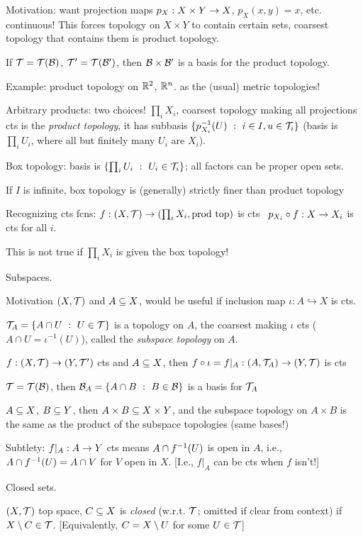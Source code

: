 \documentclass[12pt]{article}
\begin{document}
Motivation: want projection maps $p_X:X\times Y\rightarrow X$, $p_X(x,y)=x$, etc. continuous! This
forces topology on $X\times Y$ to contain certain sets, coarsest topology that contains them 
is product topology.

If ${\mathcal T}={\mathcal T}({\mathcal B})$, ${\mathcal T}^\prime={\mathcal T}({\mathcal B}^\prime)$, then ${\mathcal B}\times{\mathcal B}^\prime$ is a basis for the product topology.

Example: product topology on ${\mathbb R}^2$, ${\mathbb R}^n$.  as the (usual) metric topologies!

Arbitrary products: two choices! $\prod_i X_i$, coarsest topology making all projections cts
is the {\it product topology}, it has subbasis $\{p_{X_i}^{-1}(U)\ :\ i\in I, u\in {\mathcal T}_i\}$
(basis is $\prod_i U_i$, where all but finitely many $U_i$ are $X_i$).

Box topology: basis is $\{\prod_i U_i\ :\ U_i\in\mt_i\}$; all factors can be proper open sets.

If $I$ is infinite, box topology is (generally) strictly finer than product topology

Recognizing cts fcns: $f:(X,{\mathcal T})\rightarrow (\prod_i X_i,\textrm{prod top})$ is cts \lra\ 
$p_{X_i}\circ f: X\rightarrow X_i$ is cts for all $i$.

This is not true if $\prod_i X_i$ is given the box topology!

\msk

Subspaces.

Motivation $(X,{\mathcal T})$ and $A\subseteq X$, would be useful if inclusion map $\iota:A\hookrightarrow X$
is cts.

${\mathcal T}_A = \{A\cap U\ :\ U\in{\mathcal T}\}$ is a topology on $A$, the coarsest making $\iota$ cts
($A\cap U = \iota^{-1}(U)$), called the {\it subspace topology} on $A$.

$f:(X,{\mathcal T})\rightarrow (Y,{\mathcal T}^\prime)$ cts and $A\subseteq X$, then $f\circ\iota=f|_A:(A,{\mathcal T}_A)\rightarrow (Y,{\mathcal T})$ is cts

${\mathcal T}={\mathcal T}({\mathcal B})$, then ${\mathcal B}_A = \{A\cap B\ :\ B\in{\mathcal B}\}$ is a basis for ${\mathcal T}_A$
 
$A\subseteq X$, $B\subseteq Y$, then $A\times B\subseteq X\times Y$, and the subspace topology on 
$A\times B$ is the same as the product of the subspace topologies (same bases!)

Subtlety: $f|_A:A\rightarrow Y$ cts means $A\cap f^{-1}(U)$ is open in $A$, i.e.,
$A\cap f^{-1}(U)=A\cap V$ for \ubr{some} $V$ open in $X$. [I.e., $f|_A$ can be cts when $f$ isn't!]

\msk

Closed sets.

$(X,{\mathcal T})$ top space, $C\subseteq X$ is {\it closed} (w.r.t. ${\mathcal T}$; omitted if clear from context)
if $X\setminus C\in{\mathcal T}$. [Equivalently, $C=X\setminus U$ for some $U\in{\mathcal T}$]
\end{document}
